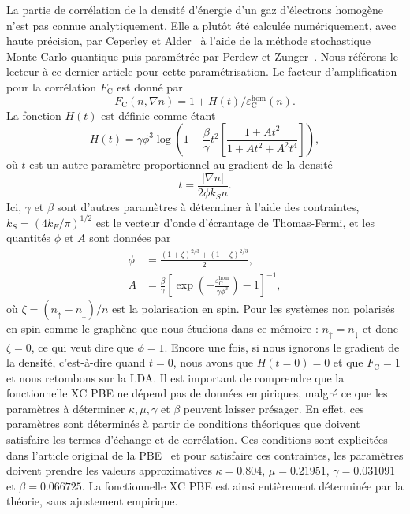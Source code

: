 La partie de corrélation de la densité d'énergie d'un gaz d'électrons homogène n'est pas connue analytiquement. Elle a plutôt été calculée numériquement, avec haute précision, par Ceperley et Alder~\cite{ceperleyGroundStateElectron1980} à l'aide de la méthode stochastique Monte-Carlo quantique puis paramétrée par Perdew et Zunger~\cite{perdewSelfinteractionCorrectionDensityfunctional1981}. Nous référons le lecteur à ce dernier article pour cette paramétrisation. Le facteur d'amplification pour la corrélation $F_\text{C}$ est donné par
\begin{equation}
    \label{eqn:a1_FC}
    F_\text{C}(n,\nabla n) = 1+H(t)/\varepsilon_\text{C}^\text{hom}(n).
\end{equation}
La fonction $H(t)$ est définie comme étant
\begin{equation}
    H(t) = \gamma\phi^3\log\left(1+\frac{\beta}{\gamma}t^2\left[\frac{1+At^2}{1+At^2+A^2t^4}\right]\right),
    \label{eqn:a1_Ht}
\end{equation}
où $t$ est un autre paramètre proportionnel au gradient de la densité
\begin{equation}
    t = \frac{|\nabla n|}{2\phi k_Sn}.
\end{equation}
Ici, $\gamma$ et $\beta$ sont d'autres paramètres à déterminer à l'aide des contraintes, $k_S=(4k_F/\pi)^{1/2}$ est le vecteur d'onde d'écrantage de Thomas-Fermi, et les quantités $\phi$ et $A$ sont données par
\begin{align}
    \phi &= \frac{(1+\zeta)^{2/3}+(1-\zeta)^{2/3}}{2},\\
    A &= \frac{\beta}{\gamma}\left[\exp\left(-\frac{\varepsilon_\text{C}^\text{hom}}{\gamma\phi^3}\right)-1\right]^{-1},
\end{align}
où $\zeta=(n_\uparrow-n_\downarrow)/n$ est la polarisation en spin. Pour les systèmes non polarisés en spin comme le graphène que nous étudions dans ce mémoire : $n_\uparrow = n_\downarrow$ et donc $\zeta=0$, ce qui veut dire que $\phi=1$. Encore une fois, si nous ignorons le gradient de la densité, c'est-à-dire quand $t=0$, nous avons que $H(t=0)=0$ et que $F_\text{C}=1$ et nous retombons sur la LDA. Il est important de comprendre que la fonctionnelle XC PBE ne dépend pas de données empiriques, malgré ce que les paramètres à déterminer $\kappa, \mu,\gamma$ et $\beta$ peuvent laisser présager. En effet, ces paramètres sont déterminés à partir de conditions théoriques que doivent satisfaire les termes d'échange et de corrélation. Ces conditions sont explicitées dans l'article original de la PBE~\cite{perdewGeneralizedGradientApproximation1996a} et pour satisfaire ces contraintes, les paramètres doivent prendre les valeurs approximatives $\kappa=0.804$, $\mu=0.21951$, $\gamma=0.031091$ et $\beta=0.066725$. La fonctionnelle XC PBE est ainsi entièrement déterminée par la théorie, sans ajustement empirique.


